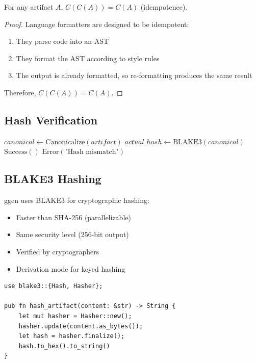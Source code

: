 \begin{theorem}
    For any artifact \(A\), \(C(C(A)) = C(A)\) (idempotence).
\end{theorem}

\begin{proof}
    Language formatters are designed to be idempotent:
    \begin{enumerate}
        \item They parse code into an AST
        \item They format the AST according to style rules
        \item The output is already formatted, so re-formatting produces the same result
    \end{enumerate}
    Therefore, \(C(C(A)) = C(A)\).
\end{proof}

\subsection{Hash Verification}

\begin{algorithm}
\caption{Hash Verification}
\begin{algorithmic}[1]
    \State $canonical \gets \text{Canonicalize}(artifact)$
    \State $actual\_hash \gets \text{BLAKE3}(canonical)$
        \State \Return $\text{Success}()$
    \Else
        \State \Return $\text{Error}(\text{"Hash mismatch"})$
    \EndIf
\EndProcedure
\end{algorithmic}
\end{algorithm}

\subsection{BLAKE3 Hashing}

ggen uses BLAKE3 for cryptographic hashing:
\begin{itemize}
    \item Faster than SHA-256 (parallelizable)
    \item Same security level (256-bit output)
    \item Verified by cryptographers
    \item Derivation mode for keyed hashing
\end{itemize}

\begin{verbatim}
use blake3::{Hash, Hasher};

pub fn hash_artifact(content: &str) -> String {
    let mut hasher = Hasher::new();
    hasher.update(content.as_bytes());
    let hash = hasher.finalize();
    hash.to_hex().to_string()
}
\end{verbatim}

